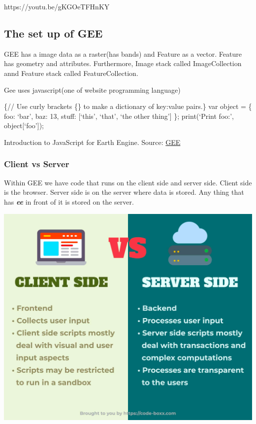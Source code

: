 \documentclass[
  letterpaper,
  DIV=11,
  numbers=noendperiod]{scrreprt}
\begin{document}
https://youtu.be/gKGOeTFHnKY

\hypertarget{the-set-up-of-gee}{%
\subsection{The set up of GEE}\label{the-set-up-of-gee}}

GEE has a image data as a raster(has bands) and Feature as a vector.
Feature has geometry and attributes. Furthermore, Image stack called
ImageCollection annd Feature stack called FeatureCollection.

Gee uses javascript(one of website programming language)

\{// Use curly brackets \{\} to make a dictionary of key:value pairs.\}
var object = \{ foo: `bar', baz: 13, stuff: {[}`this', `that', `the
other thing'{]} \}; print(`Print foo:', object{[}`foo'{]});

Introduction to JavaScript for Earth Engine. Source:
\href{https://developers.google.com/earth-engine/tutorials/tutorial_js_01}{GEE}

\hypertarget{client-vs-server}{%
\subsubsection{Client vs Server}\label{client-vs-server}}

Within GEE we have code that runs on the client side and server side.
Client side is the browser. Server side is on the server where data is
stored. Any thing that has \textbf{\emph{ee}} in front of it is stored
on the server.

\includegraphics{./images/paste-1097464A.png}
\end{document}
